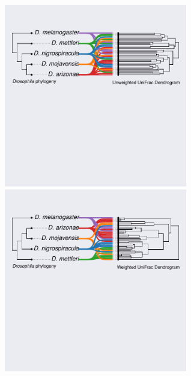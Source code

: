 \documentclass{article}
\begin{document}
\vspace*{-4.5cm}\hspace*{-4.75cm}\includegraphics[width=80mm, trim={0cm 6.5cm 0cm 1cm},clip]{../../figures/host_tree_vs_unweighted_unifrac.pdf} \\
\vspace*{-7cm}\hspace*{-4.225cm}\includegraphics[width=80mm, trim={0cm 6.5cm 0cm 1cm},clip]{../../figures/host_tree_vs_weighted_unifrac.pdf} \\
\end{document}
